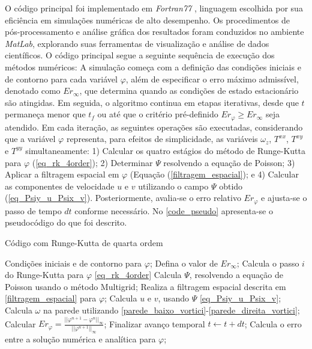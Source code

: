 O código principal foi implementado em \textit{Fortran77} \cite{Fortran97}, linguagem escolhida por sua eficiência em simulações numéricas de alto desempenho. Os procedimentos de pós-processamento e análise gráfica dos resultados foram conduzidos no ambiente \textit{MatLab}, explorando suas ferramentas de visualização e análise de dados científicos. O código principal segue a seguinte sequência de execução dos métodos numéricos: A simulação começa com a definição das condições iniciais e de contorno para cada variável $\varphi$, além de especificar o erro máximo admissível, denotado como $Er_{\infty}$, que determina quando as condições de estado estacionário são atingidas. Em seguida, o algoritmo continua em etapas iterativas, desde que $t$ permaneça menor que $t_f$ ou até que o critério pré-definido $Er_{\varphi} \geq Er_{\infty}$ seja atendido. Em cada iteração, as seguintes operações são executadas, considerando que a variável $\varphi$ representa, para efeitos de simplicidade, as variáveis $\omega_{z}$, $T^{xx}$, $T^{xy}$ e $T^{yy}$ simultaneamente: 1) Calcular os quatro estágios do método de Runge-Kutta para $\varphi$ (\autoref{eq_rk_4order}); 2) Determinar $\Psi$ resolvendo a equação de Poisson; 3) Aplicar a filtragem espacial em $\varphi$ (Equação (\autoref{filtragem_espacial}); e 4) Calcular as componentes de velocidade $u$ e $v$ utilizando o campo $\Psi$ obtido (\autoref{eq_Psiy_u_Psix_v}). Posteriormente, avalia-se o erro relativo $Er_{\varphi}$ e ajusta-se o passo de tempo $dt$ conforme necessário. No \autoref{code_pseudo} apresenta-se o pseudocódigo do que foi descrito.
\begin{algorithm}
\caption{Código com Runge-Kutta de quarta ordem}\label{code_pseudo}
\begin{algorithmic}[1]
  \State Condições iniciais e de contorno para $\varphi$;
  \State Defina o valor de $Er_{\infty}$; 
       \State Calcula o passo $i$ do Runge-Kutta para $\varphi$ \eqref{eq_rk_4order}
       \State Calcula $\Psi$, resolvendo a equação de Poisson usando o método Multigrid;
       \State Realiza a filtragem espacial descrita em \eqref{filtragem_espacial} para $\varphi$;
       \State Calcula $u$ e $v$, usando $\Psi$  \eqref{eq_Psiy_u_Psix_v};
       \State Calcula $\omega$ na parede utilizando \eqref{parede_baixo_vortici}-\eqref{parede_direita_vortici};
    \EndFor
    \State Calcular $Er_{\varphi} = \frac{||\varphi^{n+1} - \varphi^{n}||_{\infty}}{||\varphi^{n+1}||_{\infty}}$; 
        \State Finalizar avanço temporal
    \EndIf
    \State $t \gets t + dt $; 
  \EndWhile
  \State Calcula o erro entre a solução numérica e analítica para $\varphi$;
\EndFunction
\end{algorithmic}
\end{algorithm}

